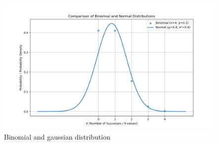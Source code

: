 \documentclass[journal,11pt,onecolumn]{IEEEtran}
\begin{document}
\begin{figure}[ht!]
	\centering
	\includegraphics[width=\columnwidth]{figs/figure.png}
	\caption{Binomial and gaussian distribution}
\end{figure}
\end{document}
